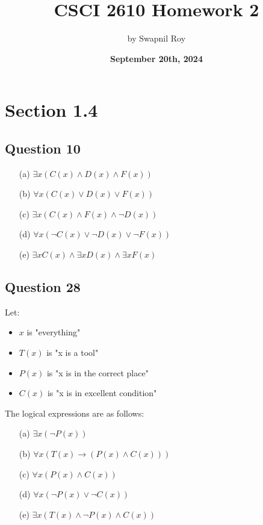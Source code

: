 \documentclass{article}
\title{\textbf{CSCI 2610 Homework 2}}
\date{\textbf{September 20th, 2024}}
\author{by Swapnil Roy}
\begin{document}
\maketitle
\raggedright

\section*{Section 1.4}

\subsection*{Question 10}
\begin{enumerate}
    \item[(a)] \(\exists x (C(x) \land D(x) \land F(x))\)
    \item[(b)] \(\forall x (C(x) \lor D(x) \lor F(x))\)
    \item[(c)] \(\exists x (C(x) \land F(x) \land \neg D(x))\)
    \item[(d)] \(\forall x (\neg C(x) \lor \neg D(x) \lor \neg F(x))\)
    \item[(e)] \(\exists x C(x) \land \exists x D(x) \land \exists x F(x)\)
\end{enumerate}

\subsection*{Question 28}
Let:
\begin{itemize}
    \item \(x\) is "everything"
    \item \(T(x)\) is "x is a tool"
    \item \(P(x)\) is "x is in the correct place"
    \item \(C(x)\) is "x is in excellent condition"
\end{itemize}

The logical expressions are as follows:
\begin{itemize}
    \item[(a)] \(\exists x (\neg P(x))\)
    \item[(b)] \(\forall x (T(x) \rightarrow (P(x) \land C(x)))\)
    \item[(c)] \(\forall x (P(x) \land C(x))\)
    \item[(d)] \(\forall x (\neg P(x) \lor \neg C(x))\)
    \item[(e)] \(\exists x (T(x) \land \neg P(x) \land C(x))\)
\end{itemize}
\end{document}
